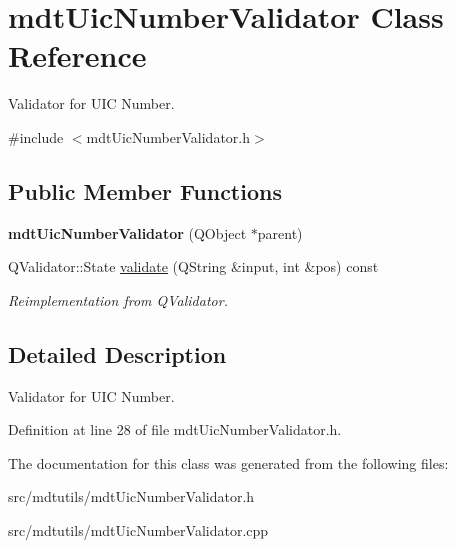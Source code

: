 \hypertarget{classmdt_uic_number_validator}{
\section{mdtUicNumberValidator Class Reference}
\label{classmdt_uic_number_validator}
}


Validator for UIC Number.  




{\ttfamily \#include $<$mdtUicNumberValidator.h$>$}

\subsection*{Public Member Functions}
\begin{DoxyCompactItemize}
\item 
\hypertarget{classmdt_uic_number_validator_afc666122b30492602463ef0ed0a9ace7}{
{\bfseries mdtUicNumberValidator} (QObject $\ast$parent)}
\label{classmdt_uic_number_validator_afc666122b30492602463ef0ed0a9ace7}

\item 
\hypertarget{classmdt_uic_number_validator_a974ac5a8918f4a2f949314d3bee07e40}{
QValidator::State \hyperlink{classmdt_uic_number_validator_a974ac5a8918f4a2f949314d3bee07e40}{validate} (QString \&input, int \&pos) const }
\label{classmdt_uic_number_validator_a974ac5a8918f4a2f949314d3bee07e40}

\begin{DoxyCompactList}\small\item\em Reimplementation from QValidator. \end{DoxyCompactList}\end{DoxyCompactItemize}


\subsection{Detailed Description}
Validator for UIC Number. 

Definition at line 28 of file mdtUicNumberValidator.h.



The documentation for this class was generated from the following files:\begin{DoxyCompactItemize}
\item 
src/mdtutils/mdtUicNumberValidator.h\item 
src/mdtutils/mdtUicNumberValidator.cpp\end{DoxyCompactItemize}
